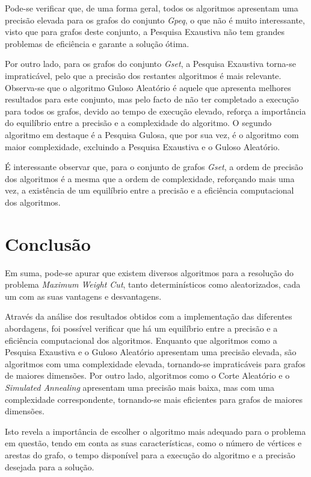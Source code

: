 \documentclass[mirror, portugues]{revdetua}
\begin{document}
Pode-se verificar que, de uma forma geral, todos os algoritmos apresentam uma precisão elevada para os grafos do conjunto \textit{Gpeq}, o que não é muito interessante, visto que para grafos deste conjunto, a Pesquisa Exaustiva não tem grandes problemas de eficiência e garante a solução ótima.

Por outro lado, para os grafos do conjunto \textit{Gset}, a Pesquisa Exaustiva torna-se impraticável, pelo que a precisão dos restantes algoritmos é mais relevante. Observa-se que o algoritmo Guloso Aleatório é aquele que apresenta melhores resultados para este conjunto, mas pelo facto de não ter completado a execução para todos os grafos, devido ao tempo de execução elevado, reforça a importância do equilíbrio entre a precisão e a complexidade do algoritmo. O segundo algoritmo em destaque é a Pesquisa Gulosa, que por sua vez, é o algoritmo com maior complexidade, excluindo a Pesquisa Exaustiva e o Guloso Aleatório.

É interessante observar que, para o conjunto de grafos \textit{Gset}, a ordem de precisão dos algoritmos é a mesma que a ordem de complexidade, reforçando mais uma vez, a existência de um equilíbrio entre a precisão e a eficiência computacional dos algoritmos.

\section{Conclusão}

Em suma, pode-se apurar que existem diversos algoritmos para a resolução do problema \textit{Maximum Weight Cut}, tanto determinísticos como aleatorizados, cada um com as suas vantagens e desvantagens.

Através da análise dos resultados obtidos com a implementação das diferentes abordagens, foi possível verificar que há um equilíbrio entre a precisão e a eficiência computacional dos algoritmos. Enquanto que algoritmos como a Pesquisa Exaustiva e o Guloso Aleatório apresentam uma precisão elevada, são algoritmos com uma complexidade elevada, tornando-se impraticáveis para grafos de maiores dimensões. Por outro lado, algoritmos como o Corte Aleatório e o \textit{Simulated Annealing} apresentam uma precisão mais baixa, mas com uma complexidade correspondente, tornando-se mais eficientes para grafos de maiores dimensões.

Isto revela a importância de escolher o algoritmo mais adequado para o problema em questão, tendo em conta as suas características, como o número de vértices e arestas do grafo, o tempo disponível para a execução do algoritmo e a precisão desejada para a solução.


\end{document}
